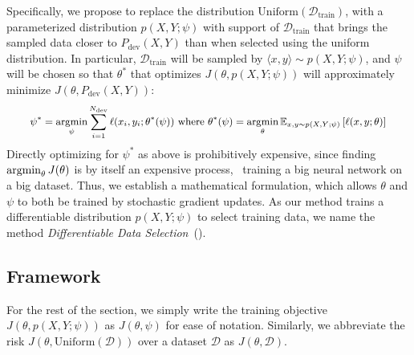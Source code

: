 
Specifically, we propose to replace the distribution $\text{Uniform}(\mathcal{D}_\text{train})$, with a parameterized distribution $p(X, Y; \psi)$ with support of $\mathcal{D}_\text{train}$ that brings the sampled data closer to $P_\text{dev}(X, Y)$ than when selected using the uniform distribution. In particular, $\mathcal{D}_\text{train}$ will be sampled by $\langle x, y \rangle \sim p(X, Y; \psi)$, 
and $\psi$ will be chosen so that $\theta^*$ that optimizes $J(\theta, p(X, Y;\psi))$ will approximately minimize $J(\theta, P_\text{dev}(X,Y))$: 
\begin{equation}
  \label{eqn:psi_theta_argmin}
   \small
  \begin{aligned}
    \psi^* = \argmin_\psi
    \sum_{i=1}^{N_\text{dev}} \ell(x_i, y_i; \theta^*(\psi))
    ~\text{where}~
    \theta^*(\psi) = \argmin_\theta \mathbb{E}_{x, y \sim p(X, Y; \psi)} \left[ \ell(x, y; \theta) \right]
  \end{aligned}
\end{equation}
Directly optimizing for $\psi^*$ as above is prohibitively expensive, since finding $\operatorname*{argmin}_\theta J(\theta)$ is by itself an expensive process, \eg~training a big neural network on a big dataset. 
Thus, we establish a mathematical formulation, which allows $\theta$ and $\psi$ to both be trained by stochastic gradient updates. As our method trains a differentiable distribution $p(X, Y; \psi)$ to select training data, we name the method \textit{Differentiable Data Selection}~(\dds).

\subsection{\label{sec:diff_data_selection}Framework}
For the rest of the section, we simply write the training objective $J(\theta, p(X, Y;\psi))$ as $J(\theta, \psi)$ for ease of notation. Similarly, we abbreviate the risk $J(\theta, \text{Uniform}(\mathcal{D}))$ over a dataset $\mathcal{D}$ as $J(\theta, \mathcal{D})$.

